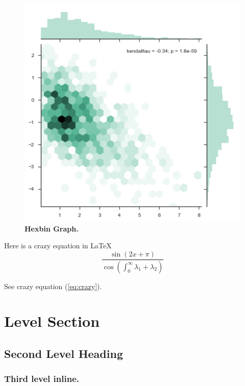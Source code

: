 \documentclass[12pt]{article}
\begin{document}
\begin{figure}[!ht]
	\centering
	\begin{minipage}{10cm}
	\includegraphics[width=\linewidth]{hexbinmarginals}
	\caption[Figure \thefigure. Hexbin Marginal Graph]{ \textbf{Hexbin Graph.} }
	\label{fig:hexbin}
	\end{minipage}
\end{figure}

Here is a crazy equation in \LaTeX
\begin{equation} \label{eq:crazy}
	\frac{\sin(2x + \pi)}{\cos(\int_0^\infty{\lambda_1 + \lambda_2})}
\end{equation}

See crazy equation (\ref{eq:crazy}).

\section{Level Section}
\blindtext
\blinditemize
\subsection{Second Level Heading}
\blindtext
\blindenumerate
\subsubsection{Third level inline.}
\blindtext
\end{document}

